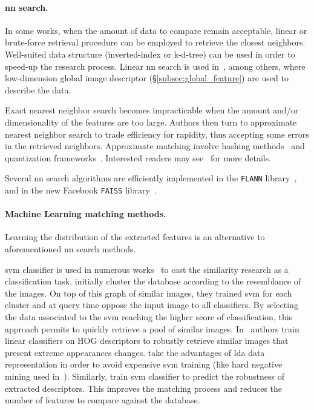 \paragraph{\Acl{nn} search.}
In some works, when the amount of data to compare remain acceptable, linear or brute-force retrieval procedure can be employed to retrieve the closest neighbors. Well-suited data structure (\eg inverted-index or k-d-tree) can be used in order to speed-up the research process. Linear \ac{nn} search is used in~\citep{Babenko2014,Sunderhauf2015,Radenovic2016,Gordo2016,Arandjelovic2017,Zamir2010,Zamir2014,Sunderhauf2015a}, among others, where low-dimension global image descriptor (\S\ref{subsec:global_feature}) are used to describe the data.

Exact nearest neighbor search becomes impracticable when the amount and/or dimensionality of the features are too large. Authors then turn to approximate nearest neighbor search to trade efficiency for rapidity, thus accepting some errors in the retrieved neighbors. Approximate matching involve hashing methods~\citep{Gionis1999} and quantization frameworks~\citep{Nister2006,Philbin2007,Jegou2011}. Interested readers may see~\citep{Wang2017} for more details.

Several \ac{nn} search algorithms are efficiently implemented in the \texttt{FLANN} library~\citep{Muja2009}, and in the new Facebook \texttt{FAISS} library~\citep{Johnson2017}.

\paragraph{Machine Learning matching methods.}
Learning the distribution of the extracted features is an alternative to aforementioned \ac{nn} search methods.

\Ac{svm} classifier is used in numerous works~\citep{Shrivastava2011,Cao2013,McManus2014,Aubry2014,Linegar2016} to cast the similarity research as a classification task. \citet{Cao2013} initially cluster the database according to the resemblance of the images. On top of this graph of similar images, they trained \ac{svm} for each cluster and at query time oppose the input image to all classifiers. By selecting the data associated to the \ac{svm} reaching the higher score of classification, this approach permits to quickly retrieve a pool of similar images. In~\citep{McManus2014,Aubry2014} authors train linear classifiers on HOG descriptors to robustly retrieve similar images that present extreme appearances changes. \citet{Aubry2014} take the advantages of \ac{lda} data representation in order to avoid expensive \ac{svm} training (like hard negative mining used in~\citep{Shrivastava2011,Kim2015}). Similarly, \citet{Kim2015} train \ac{svm} classifier to predict the robustness of extracted descriptors. This improves the matching process and reduces the number of features to compare against the database.

